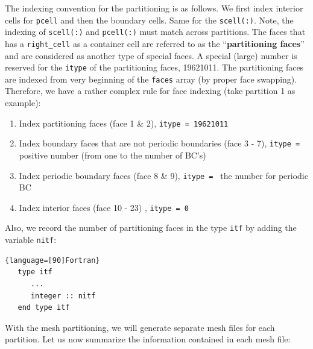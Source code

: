 \documentclass[12pt, letterpaper]{report}
\begin{document}
The indexing convention for the partitioning is as follows. We first index interior cells for
\verb+pcell+ and then the boundary cells. Same for the \verb+scell(:)+. Note, the indexing of
\verb+scell(:)+ and \verb+pcell(:)+ must match across partitions. The faces that has a
\verb+right_cell+ as a container cell are referred to as the ``{\bf partitioning faces}'' and are
considered as another type of special faces. A special (large) number is reserved for the
\verb+itype+ of the partitioning faces, 19621011. The partitioning faces are indexed from very
beginning of the \verb+faces+ array (by proper face swapping). Therefore, we have a rather complex
rule for face indexing (take partition 1 as example):

\begin{enumerate}
   \item Index partitioning faces (face 1 \& 2), \verb+itype = 19621011+
   \item Index boundary faces that are not periodic boundaries (face 3 - 7), \verb+itype = + positive
      number (from one to the number of BC's)
   \item Index periodic boundary faces (face 8 \& 9), \verb+itype = + the number for periodic BC
   \item Index interior faces (face 10 - 23) , \verb+itype = 0+
\end{enumerate}

Also, we record the number of partitioning faces in the type \verb+itf+ by adding the variable
\verb+nitf+:

\begin{lstlisting}{language=[90]Fortran}
   type itf
      ...
      integer :: nitf
   end type itf
\end{lstlisting}
\paraspace

With the mesh partitioning, we will generate separate mesh files for each partition. Let us now
summarize the information contained in each mesh file:
\end{document}
